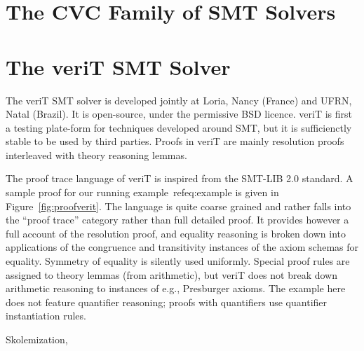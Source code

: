 \documentclass{llncs}
\newcommand{\Note}[1]{\textcolor{blue}{[#1]}}
\begin{document}
\section{The CVC Family of SMT Solvers}
\label{sec:cvc}


\section{The veriT SMT Solver}
\label{sec:veriT}

The veriT SMT solver is developed jointly at Loria, Nancy (France) and UFRN,
Natal (Brazil).  It is open-source, under the permissive BSD licence.  veriT is
first a testing plate-form for techniques developed around SMT, but it is
sufficienctly stable to be used by third parties.  Proofs in veriT are mainly
resolution proofs interleaved with theory reasoning lemmas.


The proof trace language of veriT is inspired from the SMT-LIB 2.0 standard.  A
sample proof for our running example~ref{eq:example} is given in
Figure~\ref{fig:proofverit}.  The language is quite coarse grained and rather
falls into the ``proof trace'' category rather than full detailed proof.  It
provides however a full account of the resolution proof, and equality reasoning
is broken down into applications of the congruence and transitivity instances of
the axiom schemas for equality.  Symmetry of equality is silently used
uniformly.  Special proof rules are assigned to theory lemmas (from arithmetic),
but veriT does not break down arithmetic reasoning to instances of
e.g., Presburger axioms.  The example here does not feature quantifier
reasoning; proofs with quantifiers use quantifier instantiation rules.

Skolemization,
\end{document}
